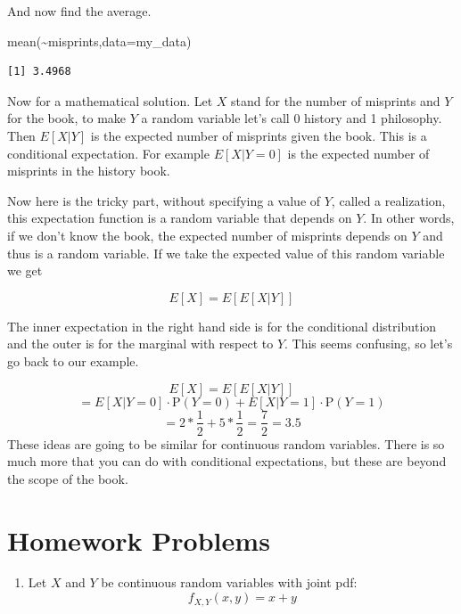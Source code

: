 \documentclass[
  letterpaper,
  DIV=11,
  numbers=noendperiod]{scrreprt}
\newenvironment{Shaded}{\begin{snugshade}}{\end{snugshade}}
\newcommand{\AttributeTok}[1]{\textcolor[rgb]{0.40,0.45,0.13}{#1}}
\newcommand{\FunctionTok}[1]{\textcolor[rgb]{0.28,0.35,0.67}{#1}}
\newcommand{\NormalTok}[1]{\textcolor[rgb]{0.00,0.23,0.31}{#1}}
\newcommand{\SpecialCharTok}[1]{\textcolor[rgb]{0.37,0.37,0.37}{#1}}
\providecommand{\tightlist}{%
  \setlength{\itemsep}{0pt}\setlength{\parskip}{0pt}}\usepackage{longtable,booktabs,array}
\begin{document}
And now find the average.

\begin{Shaded}
\begin{Highlighting}[]
\FunctionTok{mean}\NormalTok{(}\SpecialCharTok{\textasciitilde{}}\NormalTok{misprints,}\AttributeTok{data=}\NormalTok{my\_data)}
\end{Highlighting}
\end{Shaded}

\begin{verbatim}
[1] 3.4968
\end{verbatim}

Now for a mathematical solution. Let \(X\) stand for the number of
misprints and \(Y\) for the book, to make \(Y\) a random variable let's
call 0 history and 1 philosophy. Then \(E[X|Y]\) is the expected number
of misprints given the book. This is a conditional expectation. For
example \(E[X|Y=0]\) is the expected number of misprints in the history
book.

Now here is the tricky part, without specifying a value of \(Y\), called
a realization, this expectation function is a random variable that
depends on \(Y\). In other words, if we don't know the book, the
expected number of misprints depends on \(Y\) and thus is a random
variable. If we take the expected value of this random variable we get

\[E[X]=E[E[X|Y]]\]

The inner expectation in the right hand side is for the conditional
distribution and the outer is for the marginal with respect to \(Y\).
This seems confusing, so let's go back to our example.

\[E[X]=E[E[X|Y]]\]
\[=E[X|Y=0] \cdot \mbox{P}(Y=0)+E[X|Y=1] \cdot \mbox{P}(Y=1)\]
\[=2*\frac{1}{2}+5*\frac{1}{2}=\frac{7}{2}=3.5\] These ideas are going
to be similar for continuous random variables. There is so much more
that you can do with conditional expectations, but these are beyond the
scope of the book.

\section{Homework Problems}\label{homework-problems-14}

\begin{enumerate}
\def\labelenumi{\arabic{enumi}.}
\tightlist
\item
  Let \(X\) and \(Y\) be continuous random variables with joint pdf: \[
  f_{X,Y}(x,y)=x + y
  \]
\end{enumerate}
\end{document}
